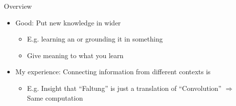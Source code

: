 \documentclass{ercisbeamer}
\begin{document}
\begin{frame}{Overview}
    \begin{tbox}
        \begin{itemize}
            \item Good: Put new knowledge in wider 
            \begin{itemize}
                \item E.g. learning an  or grounding it in something 
                \item Give meaning to what you learn
            \end{itemize}

            \vspace{1em}
            
            \item My experience: Connecting information from different contexts is 
            \begin{itemize}
                \item E.g. Insight that ``Faltung''  is just a translation of ``Convolution''  $\Rightarrow$ Same computation
            \end{itemize}
        \end{itemize}
        \vspace{-.8em}


\end{tbox}
\end{frame}
\end{document}
